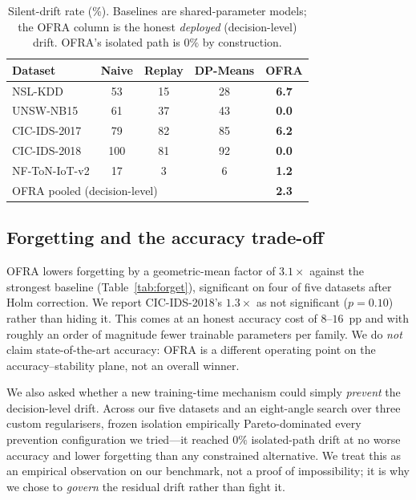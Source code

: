 \documentclass[conference]{IEEEtran}
\begin{document}
\begin{table}[t]
\caption{Silent-drift rate (\%). Baselines are shared-parameter models; the OFRA
column is the honest \emph{deployed} (decision-level) drift. OFRA's isolated path
is $0\%$ by construction.}
\label{tab:drift}
\centering
\begin{tabular}{lcccc}
\toprule
Dataset & Naive & Replay & DP-Means & \textbf{OFRA} \\
\midrule
NSL-KDD        & 53 & 15 & 28 & \textbf{6.7} \\
UNSW-NB15      & 61 & 37 & 43 & \textbf{0.0} \\
CIC-IDS-2017   & 79 & 82 & 85 & \textbf{6.2} \\
CIC-IDS-2018   & 100 & 81 & 92 & \textbf{0.0} \\
NF-ToN-IoT-v2  & 17 & 3 & 6 & \textbf{1.2} \\
\midrule
\multicolumn{4}{l}{OFRA pooled (decision-level)} & \textbf{2.3} \\
\bottomrule
\end{tabular}
\end{table}

\subsection{Forgetting and the accuracy trade-off}
\label{sec:results-pareto}

OFRA lowers forgetting by a geometric-mean factor of $3.1\times$ against the
strongest baseline (Table~\ref{tab:forget}), significant on four of five datasets
after Holm correction. We report CIC-IDS-2018's $1.3\times$ as not significant
($p=0.10$) rather than hiding it. This comes at an honest accuracy cost of
$8$--$16$~pp and with roughly an order of magnitude fewer trainable parameters
per family. We do \emph{not} claim state-of-the-art accuracy: OFRA is a different
operating point on the accuracy--stability plane, not an overall winner.

We also asked whether a new training-time mechanism could simply \emph{prevent}
the decision-level drift. Across our five datasets and an eight-angle search over
three custom regularisers, frozen isolation empirically Pareto-dominated every
prevention configuration we tried---it reached $0\%$ isolated-path drift at no
worse accuracy and lower forgetting than any constrained alternative. We treat
this as an empirical observation on our benchmark, not a proof of impossibility;
it is why we chose to \emph{govern} the residual drift rather than fight it.
\end{document}
